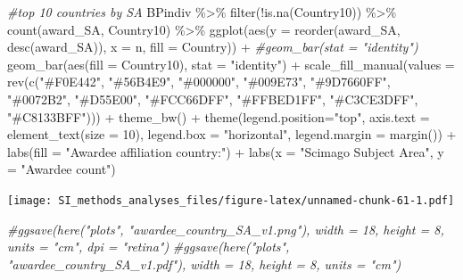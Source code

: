 \documentclass[
]{article}
\newenvironment{Shaded}{\begin{snugshade}}{\end{snugshade}}
\newcommand{\AttributeTok}[1]{\textcolor[rgb]{0.77,0.63,0.00}{#1}}
\newcommand{\CommentTok}[1]{\textcolor[rgb]{0.56,0.35,0.01}{\textit{#1}}}
\newcommand{\DecValTok}[1]{\textcolor[rgb]{0.00,0.00,0.81}{#1}}
\newcommand{\FunctionTok}[1]{\textcolor[rgb]{0.00,0.00,0.00}{#1}}
\newcommand{\NormalTok}[1]{#1}
\newcommand{\SpecialCharTok}[1]{\textcolor[rgb]{0.00,0.00,0.00}{#1}}
\newcommand{\StringTok}[1]{\textcolor[rgb]{0.31,0.60,0.02}{#1}}
\begin{document}
\begin{Shaded}
\begin{Highlighting}[]
\CommentTok{\#top 10 countries by SA}
\NormalTok{BPindiv }\SpecialCharTok{\%\textgreater{}\%} 
  \FunctionTok{filter}\NormalTok{(}\SpecialCharTok{!}\FunctionTok{is.na}\NormalTok{(Country10)) }\SpecialCharTok{\%\textgreater{}\%} 
  \FunctionTok{count}\NormalTok{(award\_SA, Country10) }\SpecialCharTok{\%\textgreater{}\%} 
  \FunctionTok{ggplot}\NormalTok{(}\FunctionTok{aes}\NormalTok{(}\AttributeTok{y =} \FunctionTok{reorder}\NormalTok{(award\_SA, }\FunctionTok{desc}\NormalTok{(award\_SA)), }\AttributeTok{x =}\NormalTok{ n, }\AttributeTok{fill =}\NormalTok{ Country)) }\SpecialCharTok{+}
  \CommentTok{\#geom\_bar(stat = "identity")}
  \FunctionTok{geom\_bar}\NormalTok{(}\FunctionTok{aes}\NormalTok{(}\AttributeTok{fill =}\NormalTok{ Country10), }\AttributeTok{stat =} \StringTok{"identity"}\NormalTok{) }\SpecialCharTok{+}
  \FunctionTok{scale\_fill\_manual}\NormalTok{(}\AttributeTok{values =} \FunctionTok{rev}\NormalTok{(}\FunctionTok{c}\NormalTok{(}\StringTok{"\#F0E442"}\NormalTok{, }\StringTok{"\#56B4E9"}\NormalTok{, }\StringTok{"\#000000"}\NormalTok{, }\StringTok{"\#009E73"}\NormalTok{, }\StringTok{"\#9D7660FF"}\NormalTok{, }\StringTok{"\#0072B2"}\NormalTok{, }\StringTok{"\#D55E00"}\NormalTok{, }\StringTok{"\#FCC66DFF"}\NormalTok{, }\StringTok{"\#FFBED1FF"}\NormalTok{, }\StringTok{"\#C3CE3DFF"}\NormalTok{, }\StringTok{"\#C8133BFF"}\NormalTok{))) }\SpecialCharTok{+}
  \FunctionTok{theme\_bw}\NormalTok{() }\SpecialCharTok{+} 
  \FunctionTok{theme}\NormalTok{(}\AttributeTok{legend.position=}\StringTok{"top"}\NormalTok{, }\AttributeTok{axis.text =} \FunctionTok{element\_text}\NormalTok{(}\AttributeTok{size =} \DecValTok{10}\NormalTok{), }\AttributeTok{legend.box =} \StringTok{"horizontal"}\NormalTok{, }\AttributeTok{legend.margin =} \FunctionTok{margin}\NormalTok{()) }\SpecialCharTok{+}
  \FunctionTok{labs}\NormalTok{(}\AttributeTok{fill =} \StringTok{"Awardee affiliation country:"}\NormalTok{) }\SpecialCharTok{+}
  \FunctionTok{labs}\NormalTok{(}\AttributeTok{x =} \StringTok{"Scimago Subject Area"}\NormalTok{, }\AttributeTok{y =} \StringTok{"Awardee count"}\NormalTok{)  }
\end{Highlighting}
\end{Shaded}

\texttt{[image: SI\_methods\_analyses\_files/figure-latex/unnamed-chunk-61-1.pdf]}

\begin{Shaded}
\begin{Highlighting}[]
\CommentTok{\#ggsave(here("plots", "awardee\_country\_SA\_v1.png"), width = 18, height = 8, units = "cm", dpi = "retina")}
\CommentTok{\#ggsave(here("plots", "awardee\_country\_SA\_v1.pdf"), width = 18, height = 8, units = "cm")}
\end{Highlighting}
\end{Shaded}
\end{document}
